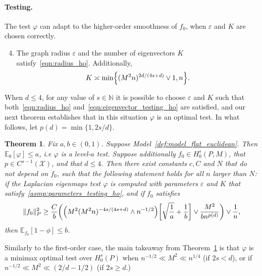 \documentclass{article}
\newcommand{\1}{\mathbf{1}}
\newcommand{\mc}[1]{\mathcal{#1}}
\newcommand{\Ebb}{\mathbb{E}}
\theoremstyle{alden}
\theoremstyle{aldenthm}
\newtheorem{theorem}{Theorem}
\theoremstyle{definition}
\theoremstyle{remark}
\begin{document}
\paragraph{Testing.} The test $\varphi$ can adapt to the higher-order smoothness of $f_0$, when $\varepsilon$ and $K$ are chosen correctly.
\begin{enumerate}[label=(A\arabic*)]
	\setcounter{enumi}{3}
	\item 
	\label{asmp:parameters_testing_ho}
	The graph radius $\varepsilon$ and the number of eigenvectors $K$ satisfy~\eqref{eqn:radius_ho}. Additionally,
	\begin{equation}
	\label{eqn:eigenvector_testing_ho}
	K \asymp \min\Bigl\{(M^2n)^{2d/(4s + d)} \vee 1, n\Bigr\}.
	\end{equation}
\end{enumerate}
When $d \leq 4$, for any value of $s \in \mathbb{N}$ it is possible to choose $\varepsilon$ and $K$ such that both~\eqref{eqn:radius_ho} and~\eqref{eqn:eigenvector_testing_ho} are satisfied, and our next theorem establishes that in this situation $\varphi$ is an optimal test. In what follows, let $p(d) = \min\{1,2s/d\}$. 
\begin{theorem}
	\label{thm:laplacian_eigenmaps_testing_ho}
	Fix $a,b \in (0,1)$. Suppose Model~\ref{def:model_flat_euclidean}. Then $\mathbb{E}_0[\varphi] \leq a$, i.e $\varphi$ is a level-$a$ test. Suppose additionally $f_0 \in H_0^s(P,M)$, that $p \in C^{s-1}(\mc{X})$, and that $d \leq 4$. Then there exist constants $c,C$ and $N$ that do not depend on $f_0$, such that the following statement holds for all $n$ larger than $N$: if the Laplacian eigenmaps test $\varphi$ is computed with parameters $\varepsilon$ and $K$ that satisfy~\ref{asmp:parameters_testing_ho}, and if $f_0$ satisfies
	\begin{equation}
	\label{eqn:laplacian_eigenmaps_testing_criticalradius_ho}
	\|f_0\|_P^2 \geq \frac{C}{b}\biggl(\Bigl(M^2(M^2n)^{-4s/(4s + d) } \wedge n^{-1/2}\Bigr)\biggl[\sqrt{\frac{1}{a}} + \frac{1}{b}\biggr] \vee \frac{M^2}{b n^{p(d)}} \biggr) \vee \frac{1}{n},
	\end{equation}
	then $\Ebb_{f_0}[1 - \phi] \leq b$.
\end{theorem}
Similarly to the first-order case, the main takeaway from Theorem~\ref{thm:laplacian_eigenmaps_testing_ho} is that $\varphi$ is a minimax optimal test over $H_0^s(P)$ when $n^{-1/2} \ll M^2 \ll n^{1/4}$ (if $2s < d$), or if $n^{-1/2} \ll M^2 \ll (2/d - 1/2)$ (if $2s \geq d$.)
\end{document}
